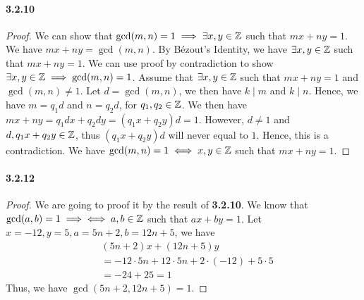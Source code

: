 \documentclass[8pt,twocolumn]{article}
\begin{document}
\paragraph{3.2.10}
\begin{proof}
  We can show that $\gcd(m,n)=1\implies\exists x,y\in\mathbb{Z}$ such that $mx+ny=1$.
  We have $mx+ny=\gcd(m,n)$. By B\'ezout's Identity, we have $\exists x,y\in\mathbb{Z}$
  such that $mx+ny=1$. We can use proof by contradiction to show $\exists
  x,y\in\mathbb{Z}\implies \gcd(m,n)=1$. Assume that $\exists x,y\in\mathbb{Z}$ such that
  $mx+ny=1$ and $\gcd(m,n)\ne 1$. Let $d=\gcd(m,n)$, we then have $k\mid m$ and
  $k\mid n$. Hence, we have $m=q_1d$ and $n=q_2d$, for $q_1,q_2\in\mathbb{Z}$. We then
  have $mx+ny=q_1dx + q_2dy = (q_1x + q_2y)d=1$. However, $d\ne 1$ and $d, q_1x
  + q_2y\in\mathbb{Z}$, thus $(q_1x + q_2y)d$ will never equal to $1$. Hence, this is a
  contradiction. We have $\gcd(m,n)=1\iff x,y\in\mathbb{Z}$ such that $mx+ny=1$.
\end{proof}

\paragraph{3.2.12}
\begin{proof}
  We are going to proof it by the result of \textbf{3.2.10}. We know that
  $\gcd(a,b)=1\implies\iff a,b\in\mathbb{Z}$ such that $ax+by=1$. Let
  $x=-12,y=5,a=5n+2,b=12n+5$, we have
  \begin{align*}
    &(5n+2)x+(12n+5)y \\
    &= -12\cdot 5n + 12\cdot 5n + 2\cdot(-12) + 5\cdot 5 \\
    &= -24 + 25 = 1
  \end{align*}
  Thus, we have $\gcd(5n+2,12n+5)=1$.
\end{proof}
\end{document}
